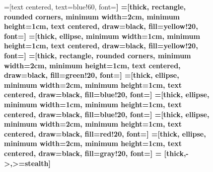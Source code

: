 \documentclass[
  fontset = source,
]{shtthesis}
\begin{document}
\begin{figure}[p]
  =[text centered, text=blue!60, font=\sffamily\bfseries]
  =[thick, rectangle, rounded corners, minimum width=2cm, minimum height=1cm, text centered, draw=black, fill=yellow!20, font=\sffamily\bfseries]
  =[thick, ellipse, minimum width=1cm, minimum height=1cm, text centered, draw=black, fill=yellow!20, font=\sffamily\bfseries]
  =[thick, rectangle, rounded corners, minimum width=2cm, minimum height=1cm, text centered, draw=black, fill=green!20, font=\sffamily\bfseries]
  =[thick, ellipse, minimum width=2cm, minimum height=1cm, text centered, draw=black, fill=blue!20, font=\sffamily\bfseries]
  =[thick, ellipse, minimum width=1cm, minimum height=1cm, text centered, draw=black, fill=blue!20, font=\sffamily\bfseries]
  =[thick, ellipse, minimum width=2cm, minimum height=1cm, text centered, draw=black, fill=red!20, font=\sffamily\bfseries]
  =[thick, ellipse, minimum width=2cm, minimum height=1cm, text centered, draw=black, fill=gray!20, font=\sffamily\bfseries]
   = [thick,->,>=stealth]
  \centering
  \begin{subfigure}[t]{0.45\columnwidth}
    \centering
\end{subfigure}
\end{figure}
\end{document}

